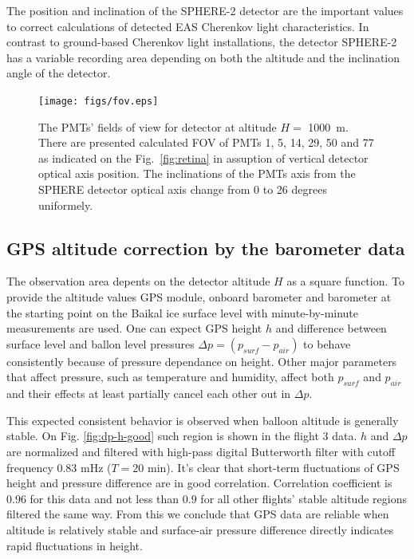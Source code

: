 \documentclass[final,5p,times,twocolumn]{elsarticle}
\begin{document}
The position and inclination of the SPHERE-2 detector are the important values to correct calculations of detected EAS Cherenkov light characteristics. In contrast to ground-based Cherenkov light installations, the detector SPHERE-2 has a variable recording area depending on both the altitude and the inclination angle of the detector.


\begin{figure}[bth]
\centering
\texttt{[image: figs/fov.eps]}
\caption{The PMTs' fields of view for detector at altitude $H=$ 1000~m. There are presented calculated FOV of PMTs 1, 5, 14, 29, 50 and 77 as indicated on the Fig.~\ref{fig:retina} in assuption of vertical detector optical axis position. The inclinations of the PMTs axis from the SPHERE detector optical axis change from 0 to 26 degrees uniformely.}
\label{fig:pmt_fov}
\end{figure}



\subsection{GPS altitude correction by the barometer data}

The observation area depents on the detector altitude $H$ as a square function. To provide the altitude values GPS module, onboard barometer and barometer at the starting point on the Baikal ice surface level with minute-by-minute measurements are used. One can expect GPS height $h$ and difference between surface level and ballon level pressures $\Delta p = (p_{surf} - p_{air})$ to behave consistently because of pressure dependance on height. Other major parameters that affect pressure, such as temperature and humidity, affect both $p_{surf}$ and $p_{air}$ and their effects at least partially cancel each other out in $\Delta p$.

This expected consistent behavior is observed when balloon altitude is generally stable. On Fig. \ref{fig:dp-h-good} such region is shown in the flight 3 data. $h$ and $\Delta p$ are normalized and filtered with high-pass digital Butterworth filter with cutoff frequency $0.83$ mHz ($T=20$ min). It's clear that short-term fluctuations of GPS height and pressure difference are in good correlation. Correlation coefficient is $0.96$ for this data and not less than $0.9$ for all other flights' stable altitude regions filtered the same way. From this we conclude that GPS data are reliable when altitude is relatively stable and surface-air pressure difference directly indicates rapid fluctuations in height.
\end{document}
